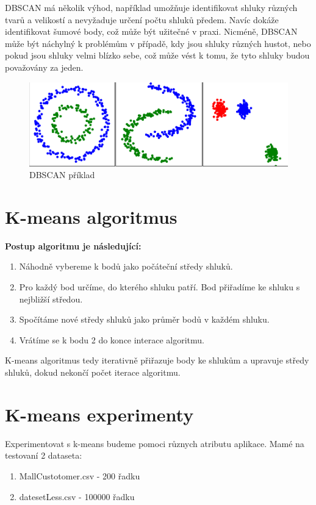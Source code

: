 \documentclass[czech,bachelor]{seminarka}
\begin{document}
DBSCAN má několik výhod, například umožňuje identifikovat shluky různých tvarů a velikostí a nevyžaduje určení počtu shluků předem. Navíc dokáže identifikovat šumové body, což může být užitečné v praxi. Nicméně, DBSCAN může být náchylný k problémům v případě, kdy jsou shluky různých hustot, nebo pokud jsou shluky velmi blízko sebe, což může vést k tomu, že tyto shluky budou považovány za jeden.
\begin{figure}[h]
	\centering
	\includegraphics[width=0.515\linewidth]{Figures/dbscan.png}
	\caption{DBSCAN příklad\cite{cluster}}
\end{figure}
\chapter{K-means algoritmus}

\textbf{Postup algoritmu je následující:}
\begin{enumerate}
\item Náhodně vybereme k bodů jako počáteční středy shluků.
\item Pro každý bod určíme, do kterého shluku patří. Bod přiřadíme ke shluku s nejbližší středou.
\item Spočítáme nové středy shluků jako průměr bodů v každém shluku.
\item Vrátíme se k bodu 2 do konce interace algoritmu.
\end{enumerate}

K-means algoritmus tedy iterativně přiřazuje body ke shlukům a upravuje středy shluků, dokud nekončí počet iterace algoritmu.

\chapter{K-means experimenty}
Experimentovat s k-means budeme pomoci různych atributu aplikace. Mamé na testovaní 2 dataseta:
\begin{enumerate}
\item MallCustotomer.csv - 200 řadku
\item datesetLess.csv - 100000 řadku
\end{enumerate}
\end{document}
